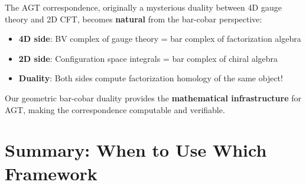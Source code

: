 \begin{remark}\label{rem:agt-why-matters}
The AGT correspondence, originally a mysterious duality between 4D gauge theory 
and 2D CFT, becomes \textbf{natural} from the bar-cobar perspective:

\begin{itemize}
\item \textbf{4D side}: BV complex of gauge theory = bar complex of factorization 
      algebra
\item \textbf{2D side}: Configuration space integrals = bar complex of chiral algebra
\item \textbf{Duality}: Both sides compute factorization homology of the same object!
\end{itemize}

Our geometric bar-cobar duality provides the \textbf{mathematical infrastructure} 
for AGT, making the correspondence computable and verifiable.
\end{remark}


\section{Summary: When to Use Which Framework}
\label{sec:framework-guidelines}

